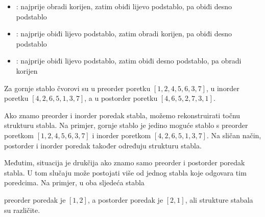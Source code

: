 \begin{itemize}
\item {}: najprije obradi korijen,
zatim obiđi lijevo podstablo, pa obiđi desno podstablo
\item {}: najprije obiđi lijevo podstablo,
zatim obradi korijen, pa obiđi desno podstablo
\item {}: najprije obiđi lijevo podstablo,
zatim obiđi desno podstablo, pa obradi korijen
\end{itemize}

Za gornje stablo čvorovi su u
preorder poretku
$[1,2,4,5,6,3,7]$,
u inorder poretku $[4,2,6,5,1,3,7]$,
a u postorder poretku $[4,6,5,2,7,3,1]$.

Ako znamo preorder i inorder poredak
stabla, možemo rekonstruirati točnu strukturu stabla.
Na primjer, gornje stablo je jedino moguće stablo
s preorder poretkom $[1,2,4,5,6,3,7]$ i
inorder poretkom $[4,2,6,5,1,3,7]$.
Na sličan način, postorder i inorder poredak
također određuju strukturu stabla.

Međutim, situacija je drukčija ako znamo samo
preorder i postorder poredak stabla.
U tom slučaju može postojati više od jednog stabla
koje odgovara tim poredcima.
Na primjer, u oba sljedeća stabla
\begin{center}
\end{center}
preorder poredak je $[1,2]$, a postorder poredak je $[2,1]$,
ali strukture stabala su različite.

